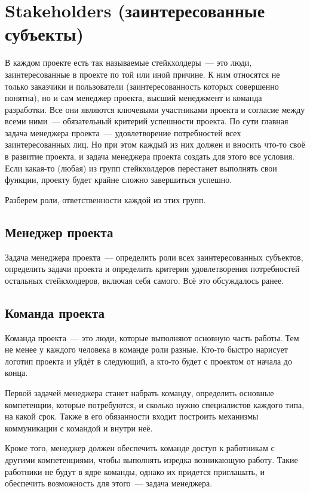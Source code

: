 \documentclass{../../text-style}
\begin{document}
\section{Stakeholders (заинтересованные субъекты)}

В каждом проекте есть так называемые стейкхолдеры~--- это люди, заинтересованные в проекте по той или иной причине. К ним относятся не только заказчики и пользователи (заинтересованность которых совершенно понятна), но и сам менеджер проекта, высший менеджмент и команда разработки. Все они являются ключевыми участниками проекта и согласие между всеми ними~--- обязательный критерий успешности проекта. По сути главная задача менеджера проекта~--- удовлетворение потребностей всех заинтересованных лиц. Но при этом каждый из них должен и вносить что-то своё в развитие проекта, и задача менеджера проекта создать для этого все условия. Если какая-то (любая) из групп стейкхолдеров перестанет выполнять свои функции, проекту будет крайне сложно завершиться успешно.

Разберем роли, ответственности каждой из этих групп.

\subsection{Менеджер проекта}

Задача менеджера проекта~--- определить роли всех заинтересованных субъектов, определить задачи проекта и определить критерии удовлетворения потребностей остальных стейкхолдеров, включая себя самого. Всё это обсуждалось ранее. 

\subsection{Команда проекта}

Команда проекта~--- это люди, которые выполняют основную часть работы. Тем не менее у каждого человека в команде роли разные. Кто-то быстро нарисует логотип проекта и уйдёт в следующий, а кто-то будет с проектом от начала до конца.

Первой задачей менеджера станет набрать команду, определить основные компетенции, которые потребуются, и сколько нужно специалистов каждого типа, на какой срок. Также в его обязанности входит построить механизмы коммуникации с командой и внутри неё.

Кроме того, менеджер должен обеспечить команде доступ к работникам с другими компетенциями, чтобы выполнять изредка возникающую работу. Такие работники не будут в ядре команды, однако их придется приглашать, и обеспечить возможность для этого~--- задача менеджера.
\end{document}
